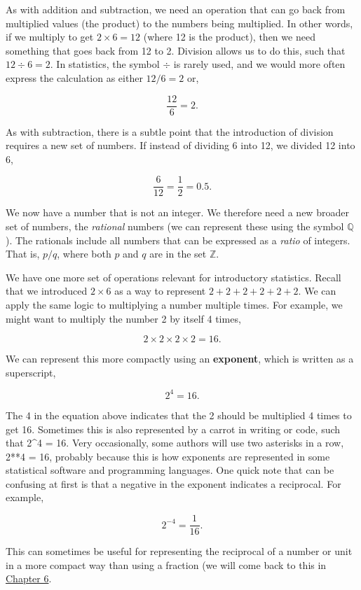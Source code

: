 \documentclass[
]{scrbook}
\begin{document}
As with addition and subtraction, we need an operation that can go back from multiplied values (the product) to the numbers being multiplied.
In other words, if we multiply to get \(2 \times 6 = 12\) (where 12 is the product), then we need something that goes back from 12 to 2.
Division allows us to do this, such that \(12 \div 6 = 2\).
In statistics, the symbol \(\div\) is rarely used, and we would more often express the calculation as either \(12/6 = 2\) or,

\[\frac{12}{6} = 2.\]

As with subtraction, there is a subtle point that the introduction of division requires a new set of numbers.
If instead of dividing 6 into 12, we divided 12 into 6,

\[\frac{6}{12} = \frac{1}{2} = 0.5.\]

We now have a number that is not an integer.
We therefore need a new broader set of numbers, the \emph{rational} numbers (we can represent these using the symbol \(\mathbb{Q}\)).
The rationals include all numbers that can be expressed as a \emph{ratio} of integers.
That is, \(p / q\), where both \(p\) and \(q\) are in the set \(\mathbb{Z}\).

We have one more set of operations relevant for introductory statistics.
Recall that we introduced \(2 \times 6\) as a way to represent \(2 + 2 + 2 + 2 + 2 + 2\).
We can apply the same logic to multiplying a number multiple times.
For example, we might want to multiply the number 2 by itself 4 times,

\[2 \times 2 \times 2 \times 2 = 16.\]

We can represent this more compactly using an \textbf{exponent}, which is written as a superscript,

\[2^{4} = 16.\]

The 4 in the equation above indicates that the 2 should be multiplied 4 times to get 16.
Sometimes this is also represented by a carrot in writing or code, such that 2\^{}4 = 16.
Very occasionally, some authors will use two asterisks in a row, 2**4 = 16, probably because this is how exponents are represented in some statistical software and programming languages.
One quick note that can be confusing at first is that a negative in the exponent indicates a reciprocal.
For example,

\[2^{-4} = \frac{1}{16}.\]

This can sometimes be useful for representing the reciprocal of a number or unit in a more compact way than using a fraction (we will come back to this in \protect\hyperlink{Chapter_6}{Chapter 6}.
\end{document}
